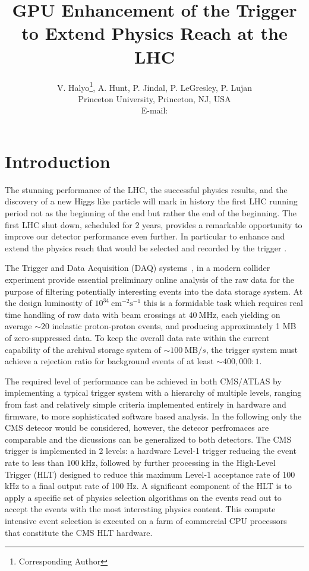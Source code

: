 \documentclass{JINST}
\title{GPU Enhancement of the Trigger to Extend Physics Reach at the LHC}
\author{V. Halyo\thanks{Corresponding Author}, A. Hunt, P. Jindal, P. LeGresley, P. Lujan \\
\llap Princeton University, Princeton, NJ, USA \\
E-mail: \email{vhalyo@gmail.com}}
\begin{document}
% 
% 
\section{Introduction} 
% 

The stunning performance of the LHC, the successful physics results, and the discovery of 
a new Higgs like particle will mark in history the first LHC running period not as the beginning of the end but rather
the end of the beginning. The first LHC shut down, scheduled for 2 years, provides a remarkable opportunity to
 improve our detector performance even further. In particular to enhance and extend the physics reach that would
 be selected and recorded by the trigger .

The Trigger and Data Acquisition (DAQ) systems~\cite{bib:CMSTDR2},\cite{bib:ATLASTDR} \cite{bib:CMSdetpaper} \cite{bib:ATLASdetpaper}
in a modern collider experiment provide essential preliminary online analysis of the raw data for the purpose of
filtering potentially interesting events into the data storage system.
At the design luminosity of $10^{34}~\mathrm{cm}^{-2}\mathrm{s}^{-1}$ this is a formidable task
which requires real time handling of raw data with beam crossings at $40~\mathrm{MHz}$, each yielding
on average ${\sim}20$ inelastic proton-proton events, and producing approximately 1 MB of zero-suppressed data.
To keep the overall data rate within the current capability of the archival storage
system of ${\sim}100~\mathrm{MB}/s$, the trigger system must achieve a rejection ratio for background
events of at least ${\sim}400,000:1$.

The required level of performance can be achieved in both CMS\cite{bib:CMSdetpaper}/ATLAS\cite{bib:ATLASdetpaper}
 by implementing a typical trigger system with a hierarchy of multiple levels, ranging from fast and relatively simple criteria implemented
entirely in hardware and firmware, to more sophisticated software based analysis. 
In the following only the CMS detecor would be considered, however, the detecor perfromaces
are comparable and the dicussions can be generalized to both detectors.
 The CMS trigger is implemented in 2 levels: a hardware Level-1 trigger reducing the event rate
to less than $100~\mathrm{kHz}$, followed by further processing in the High-Level Trigger (HLT)\cite{bib:CMStrigger}
designed to reduce this maximum Level-1 acceptance rate of 100 kHz to a final output rate of 100 Hz.
A significant component of the HLT is to apply a specific set of
physics selection algorithms on the events read out to accept the events with the most interesting physics 
content. This compute intensive event selection is executed on a farm of commercial CPU processors that
constitute the CMS HLT hardware.
\end{document}
